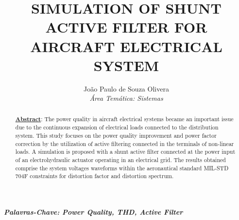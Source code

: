 \documentclass[]{seti2}
\title{\uppercase{Simulation of Shunt Active Filter for Aircraft Electrical System}}
\author{
					João Paulo de Souza Olivera\\
					{\normalsize\itshape Área Temática: Sistemas}\\
				}
\begin{document}
\maketitle

\begin{abstract}
		\underline{\textbf{Abstract}}: The power quality in aircraft electrical systems became an important issue due to the continuous expansion of electrical loads connected to the distribution system. This study focuses on the power quality improvement and power factor correction by the utilization of active filtering connected in the terminals of non-linear loads. A simulation is proposed with a shunt active filter connected at the power input of an electrohydraulic actuator operating in an electrical grid. The results obtained comprise the system voltages waveforms within the aeronautical standard MIL-STD 704F constraints for distortion factor and distortion spectrum.
\end{abstract}

\textbf{\textit{Palavras-Chave: Power Quality, THD, Active Filter}}








\newpage

\end{document}

